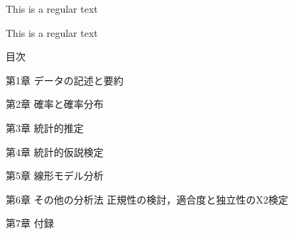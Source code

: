 \documentclass[preview]{standalone}
\begin{document}
\centering 
        {\tiny This is a regular text}

        {\tiny This is a regular text}

        目次

        第1章	データの記述と要約

        第2章	確率と確率分布

        第3章	統計的推定

        第4章	統計的仮説検定

        第5章	線形モデル分析

        第6章	その他の分析法 正規性の検討，適合度と独立性のΧ2検定

        第7章	付録
\end{document}
